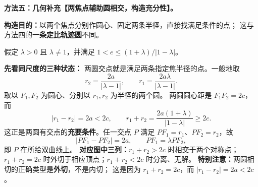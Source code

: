 \clearpage
\begin{proofbox}
\textbf{方法五：几何补充【两焦点辅助圆相交，构造充分性】。}

\textbf{构造目的：}以两个焦点分别作圆心、固定两条半径，直接找满足条件的点；
这与方法四的\textbf{一条定比轨迹圆}不同。

假定 $\lambda>0$ 且 $\lambda\ne1$，并满足
$1<e\le(1+\lambda)/|1-\lambda|$。
\begin{center}\end{center}
\textbf{先看同尺度的三种状态：} 两圆交点就是满足两条指定焦半径的点。一般地取
\[
r_2=\frac{2a}{|\lambda-1|},\qquad
r_1=\frac{2a\lambda}{|\lambda-1|}.
\]
取以 $F_1,F_2$ 为圆心、分别以 $r_1,r_2$ 为半径的两个圆。
两圆圆心距是 $F_1F_2=2c$，而
\[
|r_1-r_2|=2a<2c,\qquad
r_1+r_2=\frac{2a(1+\lambda)}{|1-\lambda|}\ge2c.
\]
这正是两圆有交点的\textbf{充要条件}。任一交点 $P$ 满足
$PF_1=r_1$、$PF_2=r_2$，故
\[
|PF_1-PF_2|=2a,\qquad PF_1=\lambda PF_2,
\]
即 $P$ 在所给双曲线上。
\textbf{对应图中三列：}$r_1+r_2>2c$ 时相交于两个对称点；
$r_1+r_2=2c$ 时外切于相应顶点；$r_1+r_2<2c$ 时分离、无解。
\textbf{特别注意：}两圆相切的正确类型是\textbf{外切}，不是内切；
这是因为 $r_1+r_2=2c$，而 $|r_1-r_2|=2a<2c$。

\end{proofbox}
